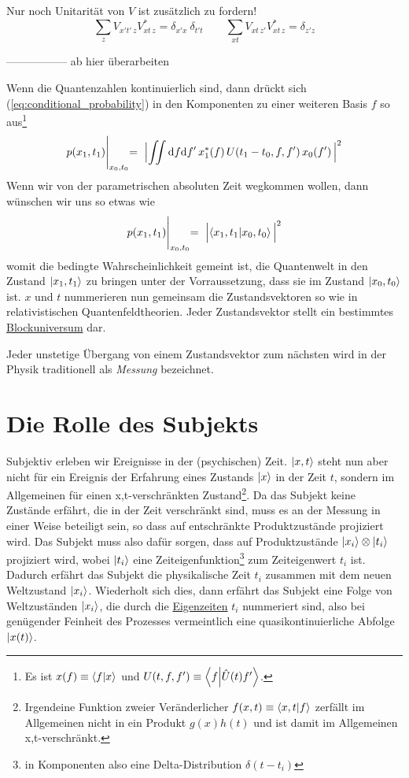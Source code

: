 \documentclass[12pt]{article}
\begin{document}
Nur noch Unitarität von $V$ ist zusätzlich zu fordern!
\begin{equation} 
\sum_{z} V_{x't'\, z} V^*_{xt\, z} = \delta_{x'x}\ \delta_{t't} \quad\quad
\sum_{xt} V_{xt\, z'} V^*_{xt\, z} = \delta_{z'z}
\end{equation}


-----------------
ab hier überarbeiten

Wenn die Quantenzahlen kontinuierlich sind, dann drückt sich (\ref{eq:conditional_probability}) in den Komponenten zu einer weiteren Basis $f$ so aus\footnote{Es ist $x(f) \equiv \bra{f}\ket{x}$ und $U(t,f,f') \equiv \bra{f}\ket{\hat{U}(t)f'}$.}
\begin{equation} 
\label{eq:conditional_probability_components}
p(x_1,t_1) \Biggl|_{x_0,t_0}
=\ \Bigl| \iint \mathrm{d}f\mathrm{d}f'\, x_1^*(f)\, U(t_1-t_0,f,f')\, x_0(f')\, \Bigl|^2
\end{equation}
Wenn wir von der parametrischen absoluten Zeit wegkommen wollen, dann wünschen wir uns so etwas wie
\begin{equation} 
\label{eq:conditional_probability_relat}
p(x_1,t_1)\Biggl|_{x_0,t_0} =\ \Bigl| \bra{x_1,t_1}\ket{x_0,t_0} \Bigl|^2
\end{equation}
womit die bedingte Wahrscheinlichkeit gemeint ist, die Quantenwelt in den Zustand $\ket{x_1,t_1}$ zu bringen unter der Vorraussetzung, dass sie im Zustand $\ket{x_0,t_0}$ ist.  $x$ und $t$ nummerieren nun gemeinsam die Zustandsvektoren so wie in relativistischen Quantenfeldtheorien. Jeder Zustandsvektor stellt ein bestimmtes \href{https://de.wikipedia.org/wiki/Blockuniversum}{Blockuniversum} dar.

Jeder unstetige Übergang von einem Zustandsvektor zum nächsten wird in der Physik traditionell als \emph{Messung} bezeichnet. 

\section{Die Rolle des Subjekts}

Subjektiv erleben wir Ereignisse in der (psychischen) Zeit. $\ket{x,t}$ steht nun aber nicht für ein Ereignis der Erfahrung eines Zustands $\ket{x}$ in der Zeit $t$, sondern im Allgemeinen für einen x,t-verschränkten Zustand\footnote{Irgendeine Funktion zweier Veränderlicher $f(x,t)\equiv\bra{x,t}\ket{f}$ zerfällt im Allgemeinen nicht in ein Produkt $g(x)h(t)$ und ist damit im Allgemeinen x,t-verschränkt.}. Da das Subjekt keine Zustände erfährt, die in der Zeit verschränkt sind, muss es an der Messung in einer Weise beteiligt sein, so dass auf entschränkte Produktzustände projiziert wird. Das Subjekt muss also dafür sorgen, dass auf Produktzustände $\ket{x_i}\otimes\ket{t_i}$ projiziert wird, wobei $\ket{t_i}$ eine Zeiteigenfunktion\footnote{in Komponenten also eine Delta-Distribution $\delta(t-t_i)$} zum Zeiteigenwert $t_i$ ist. Dadurch erfährt das Subjekt die physikalische Zeit $t_i$ zusammen mit dem neuen Weltzustand $\ket{x_i}$. Wiederholt sich dies, dann erfährt das Subjekt eine Folge von Weltzuständen $\ket{x_i}$, die durch die \href{https://de.wikipedia.org/wiki/Zeitdilatation}{Eigenzeiten} $t_i$ nummeriert sind, also bei genügender Feinheit des Prozesses vermeintlich eine quasikontinuierliche Abfolge $\ket{x(t)}$.
\end{document}
